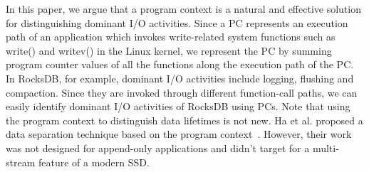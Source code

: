 In this paper, 
we argue that a program context is a natural and effective solution 
for distinguishing dominant I/O activities.  
Since a PC represents an execution path of an application which invokes 
write-related system functions such as write() and writev() in the Linux kernel,  
we represent the PC by summing program counter values of all the functions 
along the execution path of the PC.   
In RocksDB, for example, dominant I/O activities include logging, 
flushing and compaction.  
Since they are invoked through different function-call paths, 
we can easily identify dominant I/O activities of RocksDB using PCs. 
Note that using the program context to distinguish data lifetimes is not new.  
Ha et al. proposed a data separation technique based on the program context~\cite{PCHa}.   
However, their work was not designed for append-only applications and didn’t target 
for a multi-stream feature of a modern SSD.

